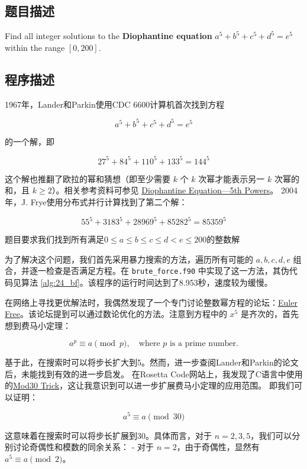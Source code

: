 \subsection{题目描述}
Find all integer solutions to the \textbf{Diophantine equation} \( a^5 + b^5 + c^5 + d^5 = e^5 \) within the range \([0, 200]\).
\subsection{程序描述}

1967年，Lander和Parkin使用CDC 6600计算机首次找到方程

\[
    a^5 + b^5 + c^5 + d^5 = e^5
\]

的一个解，即

\[
    27^5 + 84^5 + 110^5 + 133^5 = 144^5
\]

这个解也推翻了欧拉的幂和猜想（即至少需要 \(k\) 个 \(k\) 次幂才能表示另一 \(k\) 次幂的和，且 \(k \geq 2\)）。相关参考资料可参见 \href{https://mathworld.wolfram.com/DiophantineEquation5thPowers.html}{Diophantine Equation—5th Powers}。
2004年，J. Frye使用分布式并行计算找到了第二个解：

\[
    55^5 + 3183^5 + 28969^5 + 85282^5 = 85359^5
\]

题目要求我们找到所有满足$0 \leq a \leq b \leq c \leq d < e \leq 200 $的整数解

为了解决这个问题，我们首先采用暴力搜索的方法，遍历所有可能的 \(a, b, c, d, e\) 组合，并逐一检查是否满足方程。在 \texttt{brute\_force.f90} 中实现了这一方法，其伪代码见算法 \ref{alg:24_bf}。该程序的运行时间达到了8.953秒，速度较为缓慢。

在网络上寻找更优解法时，我偶然发现了一个专门讨论整数幂方程的论坛：\href{http://euler.free.fr/}{Euler Free}。该论坛提到可以通过数论优化的方法。注意到方程中的 \(x^5\) 是齐次的，首先想到费马小定理：

\[
    a^p \equiv a \pmod{p}, \quad \text{where } p \text{ is a prime number}.
\]

基于此，在搜索时可以将步长扩大到5。然而，进一步查阅Lander和Parkin的论文后，未能找到有效的进一步启发。
在Rosetta Code网站上，我发现了C语言中使用的\href{https://rosettacode.org/wiki/Euler%27s_sum_of_powers_conjecture#C}{Mod30 Trick}，这让我意识到可以进一步扩展费马小定理的应用范围。
即我们可以证明：

\[
    a^5 \equiv a \pmod{30}
\]

这意味着在搜索时可以将步长扩展到30。具体而言，对于 \(n = 2, 3, 5\)，我们可以分别讨论奇偶性和模数的同余关系：
- 对于 \(n = 2\)，由于奇偶性，显然有 \(a^5 \equiv a \pmod{2}\)。

